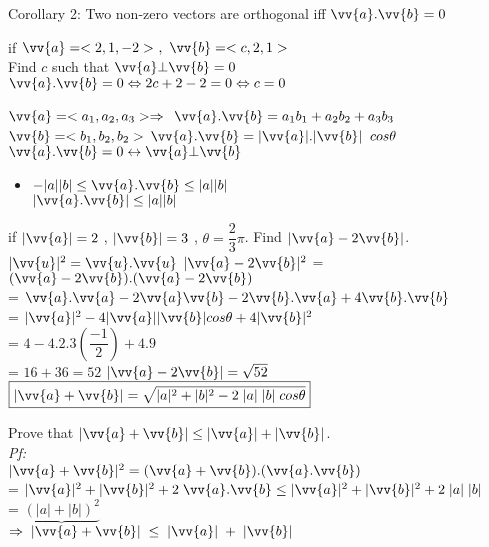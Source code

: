 \noindent{\color{smalt(darkpowderblue)}\rule{\linewidth}{.2mm}}
{\color{smalt(darkpowderblue)}Corollary 2:} Two non-zero vectors are orthogonal iff $\vv{a}.\vv{b}=0$
\begin{example}
if $\vv{a}=<2,1,-2>~,~\vv{b}=<c,2,1>$\\
Find $c$ such that $\vv{a}\bot\vv{b}=0$\\
$\vv{a}.\vv{b}=0\Leftrightarrow 2c+2-2=0\Leftrightarrow c=0$
\end{example}
$\vv{a} =<a_1,a_2,a_3>\Rightarrow\\$
$ \vv{a} . \vv{b} = a_1b_1 + a_2b_2 + a_3b_3$ \\
$\vv{b} =<b_1 , b_2 , b_2>$ \hspace{1.1cm} $\vv{a} . \vv{b} = |\vv{a}| . |\vv{b}| \; \; cos\theta$
\hspace*{3.5cm} $\vv{a} . \vv{b} = 0 \leftrightarrow  \vv{a} \bot \vv{b}$
\begin{itemize}
\item  $-|a||b| \leq \vv{a} . \vv{b} \leq |a| |b|$\\
\hspace*{1.4cm} $| \vv{a} . \vv{b}| \leq |a| |b|$
\end{itemize}
\noindent{\color{smalt(darkpowderblue)}\rule{\linewidth}{.2mm}}
\begin{example}
if $|\vv{a}| = 2$ , $|\vv{b}| = 3$ , $\theta = \dfrac{2}{3} \pi$. Find $|\vv{a} - 2 \vv{b}|$. 
$|\vv{u}|^2 = \vv{u} . \vv{u}$ \hspace{3cm}
$|\vv{a} - 2 \vv{b}|^2$  = $(\vv{a} - 2 \vv{b}) . (\vv{a} -2 \vv{b})$\\
\hspace*{7.1cm}    = $\vv{a} . \vv{a} - 2 \vv{a}
\vv{b} - 2 \vv{b} . \vv{a} + 4 \vv{b} . \vv{b}$\\
\hspace*{7.1cm}           = $|\vv{a}|^2 - 4 |\vv{a}| |\vv{b}| cos\theta + 4|\vv{b}|^2$\\
\hspace*{7.1cm}            = $4 - 4 . 2 .3 \left(\dfrac{-1}{2}\right) + 4.9$\\
\hspace*{7.1cm}           = $16 + 36 = 52$ 
$|\vv{a} - 2\vv{b}| = \sqrt{52}$\\
$\boxed{|\vv{a} + \vv{b}| = \sqrt{|a|^2 + |b|^2 -2 \; |a| \; |b| \; cos\theta}}$
\end{example}
\noindent{\color{smalt(darkpowderblue)}\rule{\linewidth}{.2mm}}
\begin{example}
Prove that $|\vv{a}  + \vv{b}| \leq |\vv{a}| + |\vv{b}| $.\\
\hspace*{1cm} \emph{Pf:}\\
$|\vv{a} + \vv{b}|^2 = (\vv{a} + \vv{b}) . (\vv{a} . \vv{b})$\\
\hspace*{1.35cm} = $|\vv{a}|^2 + |\vv{b}|^2 + 2 \; \vv{a} . \vv{b} \leq |\vv{a}|^2 + |\vv{b}|^2 + 2 \; |a| \; |b|$\\
\hspace*{4.95cm} = $\underbrace{(|a| + |b| )^2}$\\
$\Rightarrow \; |\vv{a} + \vv{b}| \; \leq \; |\vv{a}| \; + \; |\vv{b}|$

\end{example}
